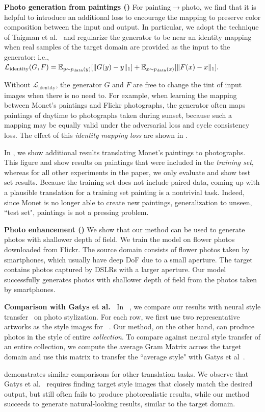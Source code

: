 {\bf Photo generation from paintings ()} 
For painting$\rightarrow$photo, we find that it is helpful to introduce an additional loss to encourage the mapping to preserve color composition between the input and output. In particular, we adopt the technique of Taigman et al.~\cite{taigman2016unsupervised} and regularize the generator to be near an identity mapping when real samples of the target domain are provided as the input to the generator: i.e., $ \mathcal{L}_{\text{identity}}(G, F) = \mathbb{E}_{y\sim p_{\text{data}}(y)}[\lVert G(y) - y\rVert_1]+\mathbb{E}_{x\sim p_{\text{data}}(x)}
    [\lVert F(x) - x\rVert_1].$ 

Without $\mathcal{L}_{\text{identity}}$, the generator $G$ and $F$ are free to change the tint of input images when there is no need to. For example, when learning the mapping between Monet's paintings and Flickr photographs, the generator often maps paintings of daytime to photographs taken during sunset, because such a mapping may be equally valid under the adversarial loss and cycle consistency loss. 
The effect of this \emph{identity mapping loss} are shown in .

In , we show additional results translating Monet's paintings to photographs. This figure and  show results on paintings that were included in the \emph{training set}, whereas for all other experiments in the paper, we only evaluate and show test set results. Because the training set does not include paired data, coming up with a plausible translation for a training set painting is a nontrivial task. Indeed, since Monet is no longer able to create new paintings, generalization to unseen, ``test set", paintings is not a pressing problem.

{\bf Photo enhancement ()} We show that our method can be used to generate photos with shallower depth of field. We train the model on flower photos downloaded from Flickr. The source domain consists of flower photos taken by smartphones, which usually have deep DoF due to a small aperture. The target contains photos captured by DSLRs with a larger aperture. Our model successfully generates photos with shallower depth of field from the photos taken by smartphones. 


{\bf Comparison with Gatys et al.~\cite{gatys2015neural}}
In ~, we compare our results with neural style transfer~\cite{gatys2015neural} on photo stylization. For each row, we first use two representative artworks as the style images for ~\cite{gatys2015neural}. Our method, on the other hand, can produce photos in the style of entire \emph{collection}. To compare against neural style transfer of an entire collection, we compute the average Gram Matrix across the target domain and use this matrix to transfer the ``average style" with Gatys et al~\cite{gatys2015neural}. 

 demonstrates similar comparisons for other translation tasks. 
We observe that Gatys et al.~\cite{gatys2015neural} requires finding target style images that closely match the desired output, but still often fails to produce photorealistic results, while our method succeeds to generate natural-looking results, similar to the target domain. 